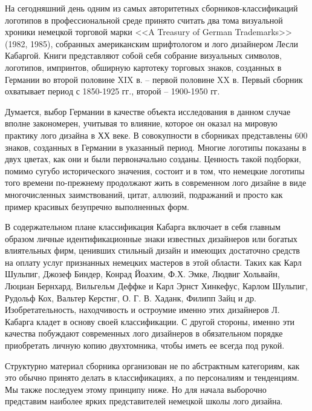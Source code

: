 На сегодняшний день одним из самых авторитетных сборников-классификаций логотипов в профессиональной
среде принято считать два тома визуальной хроники немецкой торговой марки <<A Treasury of German
Trademarks>> (1982, 1985), собранных американским шрифтологом и лого дизайнером Лесли
Кабаргой. Книги представляют собой себя собрание визуальных символов, логотипов, импринтов, обширную
картотеку торговых знаков, созданных в Германии во второй половине XIX в. -- первой половине XX
в. Первый сборник охватывает период с 1850-1925 гг., второй -- 1900-1950 гг.

Думается, выбор Германии в качестве объекта исследования в данном случае вполне закономерен,
учитывая то влияние, которое он оказал на мировую практику лого дизайна в ХХ веке. В совокупности в
сборниках представлены 600 знаков, созданных в Германии в указанный период. Многие логотипы показаны
в двух цветах, как они и были первоначально созданы. Ценность такой подборки, помимо сугубо
исторического значения, состоит и в том, что немецкие логотипы того времени по-прежнему продолжают
жить в современном лого дизайне в виде многочисленных заимствований, цитат, аллюзий, подражаний и
просто как пример красивых безупречно выполненных форм.

В содержательном плане классификация Кабарга включает в себя главным образом личные
идентификационные знаки известных дизайнеров или богатых влиятельных фирм, ценивших стильный дизайн
и имеющих достаточно средств на оплату услуг признанных немецких мастеров в этой области. Таких как
Карл Шульпиг, Джозеф Биндер, Конрад Йоахим, Ф.Х. Эмке, Людвиг Хольвайн, Люциан Бернхард, Вильгельм
Деффке и Карл Эрнст Хинкефус, Карлом Шульпиг, Рудольф Кох, Вальтер Керстнг, О. Г. В. Хаданк, Филипп
Зайц и др. Изобретательность, находчивость и остроумие именно этих дизайнеров Л. Кабарга кладет в
основу своей классификации. С другой стороны, именно эти качества побуждают современных лого
дизайнеров в обязательном порядке приобретать личную копию двухтомника, чтобы иметь ее всегда под
рукой.

Структурно материал сборника организован не по абстрактным категориям, как это обычно принято делать
в классификациях, а по персоналиям и тенденциям. Мы также последуем этому принципу ниже. Но для
начала выборочно представим наиболее ярких представителей немецкой школы лого дизайна.

